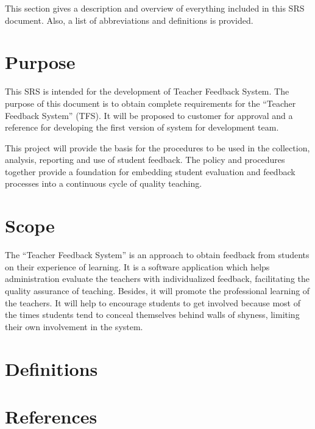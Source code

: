 \documentclass{article}
\begin{document}
\nospace This section gives a description and overview of everything included
in this SRS document. Also, a list of abbreviations and definitions is
provided.

\section{Purpose}
This SRS is intended for the development of Teacher Feedback System. 
The purpose of this document is to obtain complete requirements for 
the “Teacher Feedback System” (TFS). It will be proposed to customer 
for approval and a reference for developing the first version of system
for development team.

\nospace This project will provide the basis for the procedures to be used in 
the collection, analysis, reporting and use of student feedback. The policy
and procedures together provide a foundation for embedding student evaluation
and feedback processes into a continuous cycle of quality teaching.

\section{Scope}
The “Teacher Feedback System” is an approach to obtain feedback from students
on their experience of learning. It is a software application which helps 
administration  evaluate the teachers with individualized feedback, facilitating
the quality assurance of teaching.
Besides, it will promote the professional learning of the teachers. It will help 
to encourage students to get involved because most of the times students tend to
conceal themselves behind walls of shyness, limiting their own involvement in the 
system. 

\section{Definitions}

\section{References}
\end{document}
